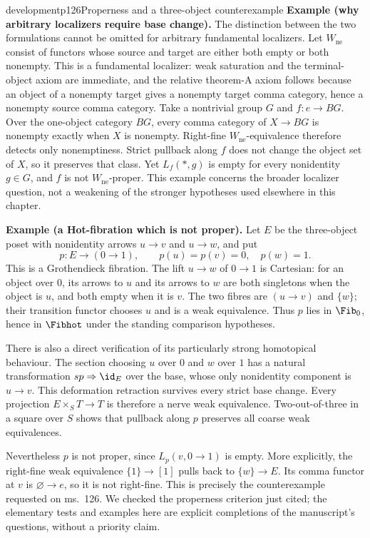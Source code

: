 \begin{dcomment}{development}{p126}{Properness and a three-object counterexample}
\textbf{Example (why arbitrary localizers require base change).}\ours
The distinction between the two formulations cannot be omitted for arbitrary fundamental localizers. Let $W_{\mathrm{ne}}$ consist of functors whose source and target are either both empty or both nonempty. This is a fundamental localizer: weak saturation and the terminal-object axiom are immediate, and the relative theorem-A axiom follows because an object of a nonempty target gives a nonempty target comma category, hence a nonempty source comma category. Take a nontrivial group $G$ and $f:e\to BG$. Over the one-object category $BG$, every comma category of $X\to BG$ is nonempty exactly when $X$ is nonempty. Right-fine $W_{\mathrm{ne}}$-equivalence therefore detects only nonemptiness. Strict pullback along $f$ does not change the object set of $X$, so it preserves that class. Yet $L_f(*,g)$ is empty for every nonidentity $g\in G$, and $f$ is not $W_{\mathrm{ne}}$-proper. This example concerns the broader localizer question, not a weakening of the stronger hypotheses used elsewhere in this chapter.

\textbf{Example (a Hot-fibration which is not proper).}\ours
Let $E$ be the three-object poset with nonidentity arrows $u\to v$ and $u\to w$, and put
\[
 p:E\longrightarrow(0\to1),\qquad p(u)=p(v)=0,\quad p(w)=1.
\]
This is a Grothendieck fibration. The lift $u\to w$ of $0\to1$ is Cartesian: for an object over $0$, its arrows to $u$ and its arrows to $w$ are both singletons when the object is $u$, and both empty when it is $v$. The two fibres are $(u\to v)$ and $\{w\}$; their transition functor chooses $u$ and is a weak equivalence. Thus $p$ lies in $\Fib_0$, hence in $\Fibhot$ under the standing comparison hypotheses.

There is also a direct verification of its particularly strong homotopical behaviour. The section choosing $u$ over $0$ and $w$ over $1$ has a natural transformation $sp\Rightarrow\id_E$ over the base, whose only nonidentity component is $u\to v$. This deformation retraction survives every strict base change. Every projection $E\times_S T\to T$ is therefore a nerve weak equivalence. Two-out-of-three in a square over $S$ shows that pullback along $p$ preserves all coarse weak equivalences.

Nevertheless $p$ is not proper, since $L_p(v,0\to1)$ is empty. More explicitly, the right-fine weak equivalence $\{1\}\to[1]$ pulls back to $\{w\}\to E$. Its comma functor at $v$ is $\varnothing\to e$, so it is not right-fine. This is precisely the counterexample requested on ms.~126. We checked the properness criterion just cited; the elementary tests and examples here are explicit completions of the manuscript's questions, without a priority claim.
\end{dcomment}


